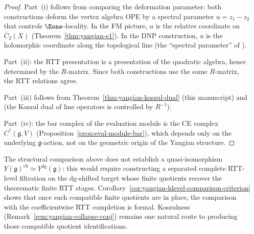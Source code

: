 \begin{proof}
Part~(i) follows from comparing the deformation parameter:
both constructions deform the vertex algebra OPE by a
spectral parameter $u = z_1 - z_2$ that controls
$\Eone$-locality.  In the FM picture, $u$ is the
relative coordinate on $\overline{C}_2(X)$
(Theorem~\ref{thm:yangian-e1}).  In the DNP construction,
$u$ is the holomorphic coordinate along the topological
line (the ``spectral parameter'' of \cite[\S5]{DNP25}).

Part~(ii): the RTT presentation is a presentation of the
quadratic algebra, hence determined by the $R$-matrix.
Since both constructions use the same $R$-matrix, the
RTT relations agree.

Part~(iii) follows from Theorem~\ref{thm:yangian-koszul-dual}
(this manuscript) and \cite[Thm.~6.12]{DNP25}
(the Koszul dual of line operators is controlled by $R^{-1}$).

Part~(iv): the bar complex of the evaluation module
is the CE complex $C^*(\mathfrak{g}, V)$
(Proposition~\ref{prop:eval-module-bar}), which
depends only on the underlying $\mathfrak{g}$-action,
not on the geometric origin of the Yangian structure.
\end{proof}

\begin{remark}
\label{rem:dg-shifted-qi}
The structural comparison above does not establish a
quasi-isomorphism $Y(\mathfrak{g})^{\mathrm{ch}}
\simeq Y^{\mathrm{dg}}(\mathfrak{g})$: this would require
constructing a separated complete RTT-level filtration on the
dg-shifted target whose finite quotients recover the theorematic finite
RTT stages.  Corollary~\ref{cor:yangian-hlevel-comparison-criterion}
shows that once such compatible finite quotients are in place, the
comparison with the coefficientwise RTT completion is formal.
Koszulness (Remark~\ref{rem:yangian-collapse-conj}) remains one natural
route to producing those compatible quotient identifications.
\end{remark}

